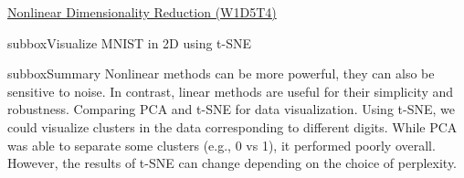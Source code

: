 \begin{textbox}{\href{https://compneuro.neuromatch.io/tutorials/W1D5_DimensionalityReduction/student/W1D5_Tutorial4.html}{ Nonlinear Dimensionality Reduction (W1D5T4)} }
\begin{subbox}{subbox}{Visualize MNIST in 2D using t-SNE}
\end{subbox}
\begin{subbox}{subbox}{Summary}
\scriptsize
Nonlinear methods can be more powerful, they can also be sensitive to noise. In contrast, linear methods are useful for their simplicity and robustness.
Comparing PCA and t-SNE for data visualization. Using t-SNE, we could visualize clusters in the data corresponding to different digits. While PCA was able to separate some clusters (e.g., 0 vs 1), it performed poorly overall.
However, the results of t-SNE can change depending on the choice of perplexity. 
\end{subbox}
\end{textbox}